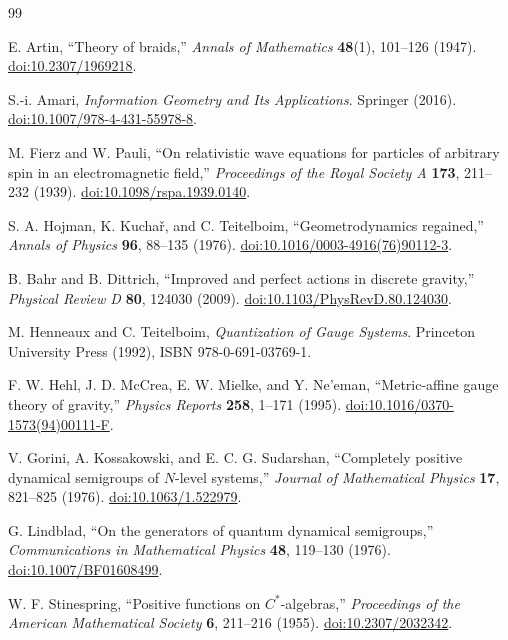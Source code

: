 \documentclass[11pt]{article}
\theoremstyle{definition}
\theoremstyle{remark}
\begin{document}
\begin{thebibliography}{99}
\raggedright
\footnotesize

E. Artin, ``Theory of braids,'' \emph{Annals of Mathematics} \textbf{48}(1), 101--126 (1947). \href{https://doi.org/10.2307/1969218}{doi:10.2307/1969218}.

S.-i. Amari, \emph{Information Geometry and Its Applications}. Springer (2016). \href{https://doi.org/10.1007/978-4-431-55978-8}{doi:10.1007/978-4-431-55978-8}.

M. Fierz and W. Pauli, ``On relativistic wave equations for particles of arbitrary spin in an electromagnetic field,'' \emph{Proceedings of the Royal Society A} \textbf{173}, 211--232 (1939). \href{https://doi.org/10.1098/rspa.1939.0140}{doi:10.1098/rspa.1939.0140}.

S. A. Hojman, K. Kucha\v{r}, and C. Teitelboim, ``Geometrodynamics regained,'' \emph{Annals of Physics} \textbf{96}, 88--135 (1976). \href{https://doi.org/10.1016/0003-4916(76)90112-3}{doi:10.1016/0003-4916(76)90112-3}.

B. Bahr and B. Dittrich, ``Improved and perfect actions in discrete gravity,'' \emph{Physical Review D} \textbf{80}, 124030 (2009). \href{https://doi.org/10.1103/PhysRevD.80.124030}{doi:10.1103/PhysRevD.80.124030}.

M. Henneaux and C. Teitelboim, \emph{Quantization of Gauge Systems}. Princeton University Press (1992), ISBN 978-0-691-03769-1.

F. W. Hehl, J. D. McCrea, E. W. Mielke, and Y. Ne'eman, ``Metric-affine gauge theory of gravity,'' \emph{Physics Reports} \textbf{258}, 1--171 (1995). \href{https://doi.org/10.1016/0370-1573(94)00111-F}{doi:10.1016/0370-1573(94)00111-F}.

V. Gorini, A. Kossakowski, and E. C. G. Sudarshan, ``Completely positive dynamical semigroups of $N$-level systems,'' \emph{Journal of Mathematical Physics} \textbf{17}, 821--825 (1976). \href{https://doi.org/10.1063/1.522979}{doi:10.1063/1.522979}.

G. Lindblad, ``On the generators of quantum dynamical semigroups,'' \emph{Communications in Mathematical Physics} \textbf{48}, 119--130 (1976). \href{https://doi.org/10.1007/BF01608499}{doi:10.1007/BF01608499}.

W. F. Stinespring, ``Positive functions on $C^*$-algebras,'' \emph{Proceedings of the American Mathematical Society} \textbf{6}, 211--216 (1955). \href{https://doi.org/10.2307/2032342}{doi:10.2307/2032342}.


\end{thebibliography}
\end{document}
